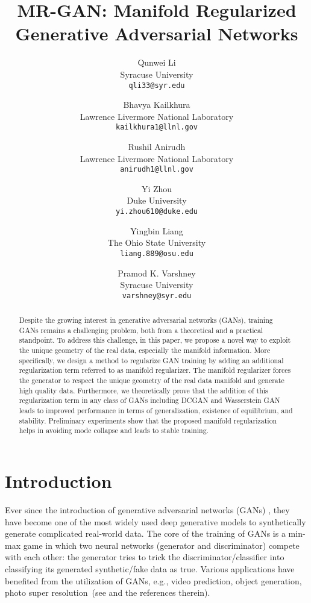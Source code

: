 \documentclass[10pt,twocolumn,letterpaper]{article}
\begin{document}
\title{MR-GAN: Manifold Regularized Generative Adversarial Networks}

\author{Qunwei Li\\
Syracuse University\\
{\tt\small qli33@syr.edu}
\and
Bhavya Kailkhura \\
Lawrence Livermore National Laboratory\\
{\tt\small kailkhura1@llnl.gov}
\and
Rushil Anirudh \\
Lawrence Livermore National Laboratory\\
{\tt\small anirudh1@llnl.gov}
\and
Yi Zhou \\
Duke University\\
{\tt\small yi.zhou610@duke.edu}
\and
Yingbin Liang \\
The Ohio State University\\
{\tt\small liang.889@osu.edu}
\and
Pramod K. Varshney \\
Syracuse University\\
{\tt\small varshney@syr.edu}
}

\maketitle

\begin{abstract}
Despite the growing interest in generative adversarial networks (GANs), training GANs remains a challenging problem, both from a theoretical and a practical standpoint. To address this challenge, in this paper, we propose a novel way to exploit the unique geometry of the real data, especially the manifold information. More specifically, we design a method to regularize GAN training by adding an additional regularization term referred to as manifold regularizer. The manifold regularizer forces the generator to respect the unique geometry of the real data manifold and generate high quality data. Furthermore, we theoretically prove that the addition of this regularization term in any class of GANs including DCGAN and Wasserstein GAN leads to improved performance in terms of generalization, existence of equilibrium, and stability. Preliminary experiments show that the proposed manifold regularization helps in avoiding mode collapse and leads to stable training.
\end{abstract}

\section{Introduction}
Ever since the introduction of generative adversarial networks (GANs) \cite{goodfellow2014generative}, they have become one of the most widely used deep generative models to synthetically generate complicated real-world data. The core of the training of GANs is a min-max game in
which two neural networks (generator and discriminator) compete with each other: the generator tries to trick the discriminator/classifier into classifying its generated synthetic/fake data as true. 
Various applications have benefited from the utilization of GANs, e.g., video prediction, object generation, photo super resolution~(see \cite{ledig2017photo,tulyakov2017mocogan} and the references therein).
\end{document}
